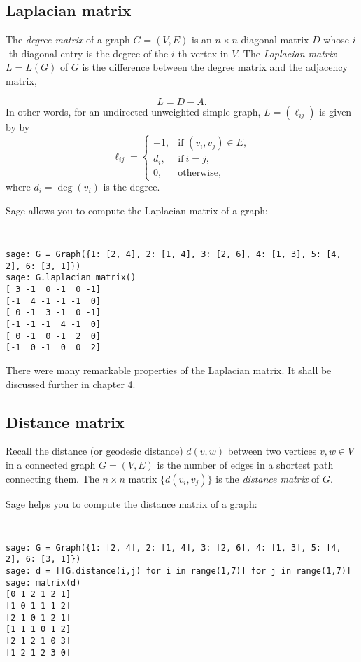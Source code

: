 \subsection{Laplacian matrix}

The {\it degree matrix} of a graph $G=(V,E)$ is an $n\times n$ 
diagonal matrix $D$ whose $i$-th diagonal entry is the degree of the
$i$-th vertex in $V$.
The {\it Laplacian matrix} $L = L(G)$ 
of $G$ is the difference between the degree matrix and the adjacency
matrix,

\[
L = D-A.
\]
In other words, for an undirected unweighted simple graph,
$L = (\ell_{ij})$ is given by by
\[
\ell_{ij}
=
\begin{cases}
-1, & \text{if $(v_i, v_j) \in E$}, \\
d_i, & \text{if}\ i=j,\\
0, & \text{otherwise},
\end{cases}
\]
where $d_i=\deg(v_i)$ is the degree.

Sage allows you to compute the Laplacian matrix of a
graph:

%
\begin{center}
\fontsize{9pt}{9pt}
\selectfont
\tt
\begin{lstlisting}
sage: G = Graph({1: [2, 4], 2: [1, 4], 3: [2, 6], 4: [1, 3], 5: [4, 2], 6: [3, 1]})
sage: G.laplacian_matrix()
[ 3 -1  0 -1  0 -1]
[-1  4 -1 -1 -1  0]
[ 0 -1  3 -1  0 -1]
[-1 -1 -1  4 -1  0]
[ 0 -1  0 -1  2  0]
[-1  0 -1  0  0  2]
\end{lstlisting}
\end{center}
%
There were many remarkable properties of the Laplacian matrix.
It shall be discussed further in chapter 4.

\subsection{Distance matrix}

Recall the distance (or geodesic distance) $d(v,w)$ between two
vertices $v,w\in V$
in a connected graph $G=(V,E)$ is the number of
edges in a shortest path connecting them. 
The $n\times n$ matrix $\{d(v_i,v_j)\}$ is the
{\it distance matrix} of $G$.


Sage helps you to compute the distance matrix of a
graph:
%
\begin{center}
\fontsize{9pt}{9pt}
\selectfont
\tt
\begin{lstlisting}
sage: G = Graph({1: [2, 4], 2: [1, 4], 3: [2, 6], 4: [1, 3], 5: [4, 2], 6: [3, 1]})
sage: d = [[G.distance(i,j) for i in range(1,7)] for j in range(1,7)]
sage: matrix(d)
[0 1 2 1 2 1]
[1 0 1 1 1 2]
[2 1 0 1 2 1]
[1 1 1 0 1 2]
[2 1 2 1 0 3]
[1 2 1 2 3 0]
\end{lstlisting}
\end{center}
%

